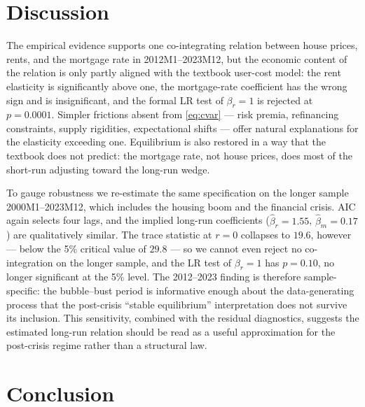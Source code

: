 \documentclass[12pt]{article}
\begin{document}


\section{Discussion}\label{sec:p2-discussion}

The empirical evidence supports one co-integrating relation between house prices, rents, and the mortgage rate in 2012M1--2023M12, but the economic content of the relation is only partly aligned with the textbook user-cost model: the rent elasticity is significantly above one, the mortgage-rate coefficient has the wrong sign and is insignificant, and the formal LR test of $\beta_r=1$ is rejected at $p=0.0001$. Simpler frictions absent from \eqref{eq:cvar} --- risk premia, refinancing constraints, supply rigidities, expectational shifts --- offer natural explanations for the elasticity exceeding one. Equilibrium is also restored in a way that the textbook does not predict: the mortgage rate, not house prices, does most of the short-run adjusting toward the long-run wedge.



To gauge robustness we re-estimate the same specification on the longer sample 2000M1--2023M12, which includes the housing boom and the financial crisis. AIC again selects four lags, and the implied long-run coefficients ($\hat\beta_r=1.55$, $\hat\beta_m=0.17$) are qualitatively similar. The trace statistic at $r=0$ collapses to $19.6$, however --- below the 5\% critical value of $29.8$ --- so we cannot even reject no co-integration on the longer sample, and the LR test of $\beta_r=1$ has $p=0.10$, no longer significant at the 5\% level. The 2012--2023 finding is therefore sample-specific: the bubble--bust period is informative enough about the data-generating process that the post-crisis ``stable equilibrium'' interpretation does not survive its inclusion. This sensitivity, combined with the residual diagnostics, suggests the estimated long-run relation should be read as a useful approximation for the post-crisis regime rather than a structural law.

\section{Conclusion}\label{sec:p2-conclusion}
\end{document}
